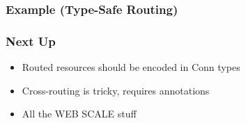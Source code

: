 \begin{frame}
  \frametitle{Example (Type-Safe Routing)}
  
\end{frame}

\begin{frame}
\end{frame}

\begin{frame}
\end{frame}

\begin{frame}
  \frametitle{Next Up}
  \begin{itemize}
    \item Routed resources should be encoded in Conn types
    \item Cross-routing is tricky, requires annotations
    \item All the WEB SCALE stuff
  \end{itemize}
\end{frame}

\begin{frame}
\end{frame}

\begin{frame}
  \titlepage
\end{frame}


